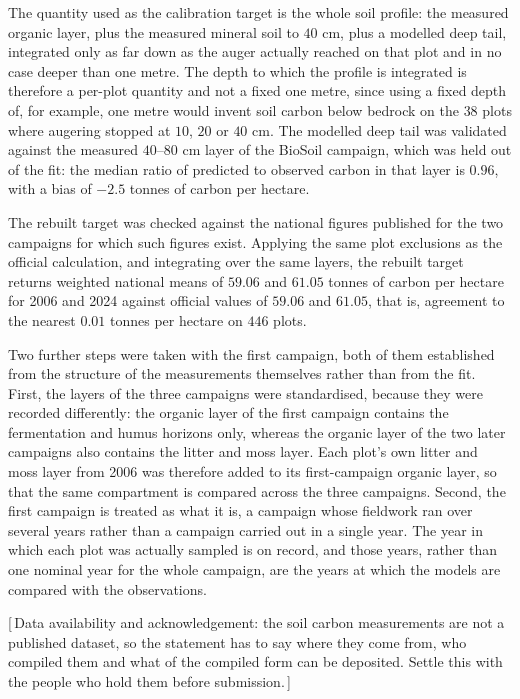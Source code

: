 \documentclass[11pt]{article}
\newcommand{\gap}[1]{\textcolor{red!70!black}{\small[\,#1\,]}}
\begin{document}
The quantity used as the calibration target is the whole soil profile: the measured
organic layer, plus the measured mineral soil to $40$ cm, plus a modelled deep
tail, integrated only as far down as the auger actually reached on that plot and in
no case deeper than one metre. The depth to which the profile is integrated is
therefore a per-plot quantity and not a fixed one metre, since using a fixed depth of, for example, one metre
would invent soil carbon below bedrock on the $38$ plots where augering stopped at
$10$, $20$ or $40$ cm. The modelled deep tail was validated against the measured
$40$--$80$ cm layer of the BioSoil campaign, which was held out of the fit: the
median ratio of predicted to observed carbon in that layer is $0.96$, with a bias
of $-2.5$ tonnes of carbon per hectare.

The rebuilt target was checked against the national figures published for the two
campaigns for which such figures exist. Applying the same plot exclusions as the
official calculation, and integrating over the same layers, the rebuilt target returns
weighted national means of $59.06$ and $61.05$ tonnes of carbon per hectare for 2006
and 2024 against official values of $59.06$ and $61.05$, that is, agreement to the
nearest $0.01$ tonnes per hectare on $446$ plots.

Two further steps were taken with the first campaign, both of them established from the
structure of the measurements themselves rather than from the fit. First, the layers of the
three campaigns were standardised, because they were recorded differently: the organic
layer of the first campaign contains the fermentation and humus horizons only, whereas
the organic layer of the two later campaigns also contains the litter and moss layer.
Each plot's own litter and moss layer from 2006 was therefore added to its
first-campaign organic layer, so that the same compartment is compared across the three
campaigns. Second, the first campaign is treated as what it is, a campaign whose
fieldwork ran over several years rather than a campaign carried out in a single year.
The year in which each plot was actually sampled is on record, and those years,
rather than one nominal year for the whole campaign, are the years at which the models
are compared with the observations.

\gap{Data availability and acknowledgement: the soil carbon measurements are not a
published dataset, so the statement has to say where they come from, who compiled them
and what of the compiled form can be deposited. Settle this with the people who hold
them before submission.}
\end{document}
